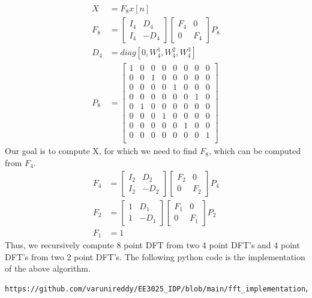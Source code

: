 \documentclass[journal,12pt,twocolumn]{IEEEtran}
\begin{document}
\begin{align}
    X &= F_8 x[n]\\
    F_8 &= \begin{bmatrix}I_4 & D_4\\I_4 & -D_4  \end{bmatrix} \begin{bmatrix} F_4 & 0 \\0 & F_4
    \end{bmatrix}P_8\\
    D_4 &= diag[0,W_4^1,W_4^2,W_4^3]\\
    P_8 &= \begin{bmatrix}
    1 & 0 & 0 & 0 & 0 & 0 & 0 & 0\\
    0 & 0 & 1 & 0 & 0 & 0 & 0 & 0\\
    0 & 0 & 0 & 0 & 1 & 0 & 0 & 0\\
    0 & 0 & 0 & 0 & 0 & 0 & 1 & 0\\
    0 & 1 & 0 & 0 & 0 & 0 & 0 & 0\\
    0 & 0 & 0 & 1 & 0 & 0 & 0 & 0\\
    0 & 0 & 0 & 0 & 0 & 1 & 0 & 0\\
    0 & 0 & 0 & 0 & 0 & 0 & 0 & 1\\
    \end{bmatrix}
\end{align}
Our goal is to compute X, for which we need to find $F_8$, which can be computed from $F_4$. 
\begin{align}
    F_4 &= \begin{bmatrix}I_2 & D_2\\I_2 & -D_2  \end{bmatrix} \begin{bmatrix} F_2 & 0 \\0 & F_2
    \end{bmatrix}P_4\\
     F_2 &= \begin{bmatrix}1 & D_1\\1 & -D_1  \end{bmatrix} \begin{bmatrix} F_1 & 0 \\0 & F_1
    \end{bmatrix}P_2\\
    F_1 &= 1
\end{align}
Thus, we recursively compute 8 point DFT from two 4 point DFT's and 4 point DFT's from two 2 point DFT's. The following python code is the implementation of the above algorithm. 
\begin{lstlisting}
https://github.com/varunireddy/EE3025_IDP/blob/main/fft_implementation/codes/ee18btech11005.py
\end{lstlisting}
\end{document}
